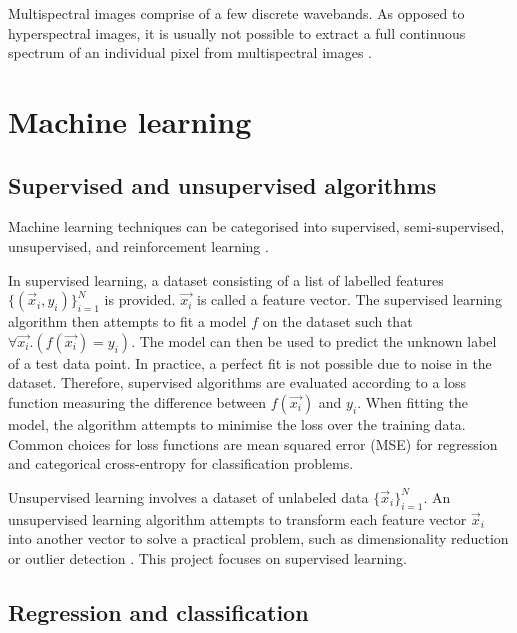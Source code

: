 \documentclass{l4proj}
\begin{document}
Multispectral images comprise of a few discrete wavebands. As opposed to hyperspectral images, it is usually not possible to extract a full continuous spectrum of an individual pixel from multispectral images \citep{abdul_multi-disnet_2019}.



\section{Machine learning}

\subsection{Supervised and unsupervised algorithms}

Machine learning techniques can be categorised into supervised, semi-supervised, unsupervised, and reinforcement learning \citep{burkov_hundred-page_2019}.

In supervised learning, a dataset consisting of a list of labelled features $\{(\vec{x}_i, y_i)\}^N_{i=1}$ is provided. $\vec{x_i}$ is called a feature vector. The supervised learning algorithm then attempts to fit a model $f$ on the dataset such that $\forall{\vec{x_i}}. (f(\vec{x_i}) = y_i)$. The model can then be used to predict the unknown label of a test data point. In practice, a perfect fit is not possible due to noise in the dataset. Therefore, supervised algorithms are evaluated according to a loss function measuring the difference between $f(\vec{x_i})$ and $y_i$. When fitting the model, the algorithm attempts to minimise the loss over the training data. Common choices for loss functions are mean squared error (MSE) for regression and categorical cross-entropy for classification problems.

Unsupervised learning involves a dataset of unlabeled data $\{\vec{x}_i\}^N_{i=1}$. An unsupervised learning algorithm attempts to transform each feature vector $\vec{x}_i$ into another vector to solve a practical problem, such as dimensionality reduction or outlier detection \citep{burkov_hundred-page_2019}. 
This project focuses on supervised learning.

\subsection{Regression and classification}
\end{document}
